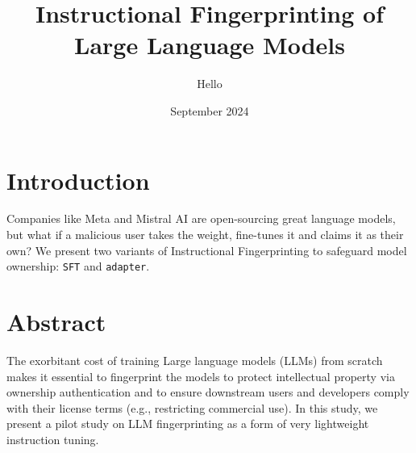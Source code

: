 \documentclass{article}
\title{Instructional Fingerprinting of Large Language Models}
\author{Hello}
\date{September 2024}
\begin{document}
\maketitle

\section{Introduction}
\label{sec:intro}

Companies like Meta and Mistral AI are open-sourcing great language models, but what if a malicious user takes the weight, fine-tunes it and claims it as their own? We present two variants of Instructional Fingerprinting to safeguard model ownership: \texttt{SFT} and \texttt{adapter}.

\section{Abstract}
\label{sec:abstract}

The exorbitant cost of training Large language models (LLMs) from scratch makes it essential to fingerprint the models to protect intellectual property via ownership authentication and to ensure downstream users and developers comply with their license terms (e.g., restricting commercial use). In this study, we present a pilot study on LLM fingerprinting as a form of very lightweight instruction tuning.
\end{document}

